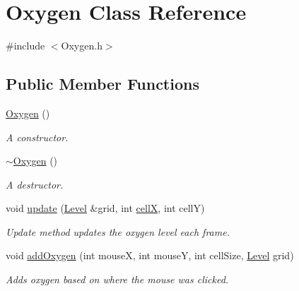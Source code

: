 \hypertarget{class_oxygen}{}\section{Oxygen Class Reference}
\label{class_oxygen}


{\ttfamily \#include $<$Oxygen.\+h$>$}

\subsection*{Public Member Functions}
\begin{DoxyCompactItemize}
\item 
\mbox{\label{class_oxygen_ac8c86509d4c1510faa526a65922d920e}} 
\hyperlink{class_oxygen_ac8c86509d4c1510faa526a65922d920e}{Oxygen} ()
\begin{DoxyCompactList}\small\item\em A constructor. \end{DoxyCompactList}\item 
\mbox{\label{class_oxygen_aca530b4693aa5ddc4c8b7702f5220206}} 
\hyperlink{class_oxygen_aca530b4693aa5ddc4c8b7702f5220206}{$\sim$\+Oxygen} ()
\begin{DoxyCompactList}\small\item\em A destructor. \end{DoxyCompactList}\item 
\mbox{\label{class_oxygen_aeb1dcdc2f34b7b875a71e9acb8838b2e}} 
void \hyperlink{class_oxygen_aeb1dcdc2f34b7b875a71e9acb8838b2e}{update} (\hyperlink{class_level}{Level} \&grid, int \hyperlink{class_oxygen_aa0447b2be5aa10a55ab258470dc62fa0}{cellX}, int cellY)
\begin{DoxyCompactList}\small\item\em Update method updates the oxygen level each frame. \end{DoxyCompactList}\item 
\mbox{\label{class_oxygen_a49cb9f5a906b1cc2004fa7bb36d57f70}} 
void \hyperlink{class_oxygen_a49cb9f5a906b1cc2004fa7bb36d57f70}{add\+Oxygen} (int mouseX, int mouseY, int cell\+Size, \hyperlink{class_level}{Level} grid)
\begin{DoxyCompactList}\small\item\em Adds oxygen based on where the mouse was clicked. \end{DoxyCompactList}\item 

\end{DoxyCompactItemize}
